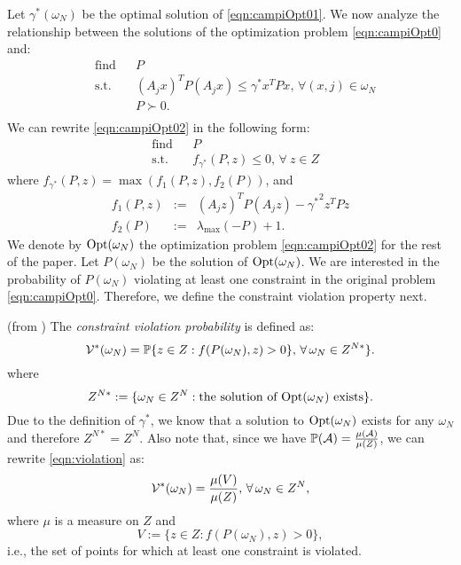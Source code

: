 Let $\gamma^*(\omega_N)$ be the optimal solution of \eqref{eqn:campiOpt01}. We now analyze the relationship between the solutions of the optimization problem \eqref{eqn:campiOpt0} and:
\begin{equation}\label{eqn:campiOpt02}
\begin{aligned}
& \text{find} & & P \\
& \text{s.t.} 
&  & (A_j x)^TP(A_j x) \leq \gamma^* x^TPx,\,\forall (x, j) \in \omega_N \\
& && P \succ 0. \\
\end{aligned}
\end{equation}
We can rewrite \eqref{eqn:campiOpt02} in the following form:
\begin{equation}
\label{eqn:campiOpt2}
\begin{aligned}
& \text{find} & & P \\
& \text{s.t.} 
& & f_{\gamma^*}(P, z) \leq 0,\,\forall\ z \in Z\end{aligned}
\end{equation}
where $f_{\gamma^*}(P,z) = \max(f_1(P, z), f_2(P))$, and 
\begin{eqnarray*}
f_1(P, z) &:=& (A_j z)^TP(A_j z) - {\gamma^*}^2 z^TPz \\
f_2(P) &:=& \lambda_{\max}(-P) +1.
\end{eqnarray*}
We denote by  $\text{Opt}(\omega_N)$ the optimization problem \eqref{eqn:campiOpt02} for the rest of the paper. Let $P(\omega_N)$ be the solution of $\text{Opt}(\omega_N)$. We are interested in the probability of $P(\omega_N)$ violating at least one constraint in the original problem \eqref{eqn:campiOpt0}. Therefore, we define the constraint violation property next.

\begin{definition}(from \cite{campi}) The \emph{constraint violation probability} is defined as:
\begin{equation}\label{eqn:violation}
\mathcal{V}^*(\omega_N)=
      \mathbb{P}\{z \in Z: f(P(\omega_N), z) > 0\},\, \forall\, \omega_N \in Z^{N*}\}.
\end{equation}
where $$Z^{N*}:=\{\omega_N \in Z^N: \text{the solution of $\text{Opt}(\omega_N)$ exists}\}.$$ 
Due to the definition of $\gamma^*$, we know that a solution to $\text{Opt}(\omega_N)$ exists for any $\omega_N$ and therefore $Z^{N*} = Z^N$. Also note that, since we have $\mathbb{P}(\mathcal{A}) = \frac{\mu(\mathcal{A})}{\mu(Z)}$, we can rewrite \eqref{eqn:violation} as:
\begin{equation*}
\mathcal{V}^*(\omega_N)=
      \frac{\mu(V)}{\mu(Z)},\, \forall\, \omega_N \in Z^N,
\end{equation*}
where $\mu$ is a measure on $Z$ and $$V:=\{z \in Z: f(P(\omega_N), z) > 0\},$$ i.e., the set of points for which at least one constraint is violated.
\end{definition}

